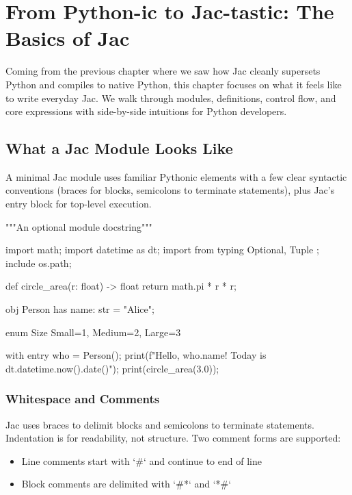 \chapter{From Python-ic to Jac-tastic: The Basics of Jac}

Coming from the previous chapter where we saw how Jac cleanly supersets Python and compiles to native Python, this chapter focuses on what it feels like to write everyday Jac. We walk through modules, definitions, control flow, and core expressions with side-by-side intuitions for Python developers.

\section{What a Jac Module Looks Like}

A minimal Jac module uses familiar Pythonic elements with a few clear syntactic conventions (braces for blocks, semicolons to terminate statements), plus Jac's entry block for top-level execution.

\begin{jacblock}
"""An optional module docstring"""

import math;
import datetime as dt;
import from typing { Optional, Tuple };
include os.path;

def circle_area(r: float) -> float {
    return math.pi * r * r;
}

obj Person {
    has name: str = "Alice";
}

enum Size { Small=1, Medium=2, Large=3 }

with entry {
    who = Person();
    print(f"Hello, {who.name}! Today is {dt.datetime.now().date()}");
    print(circle_area(3.0));
}
\end{jacblock}

\subsection{Whitespace and Comments}

Jac uses braces to delimit blocks and semicolons to terminate statements. Indentation is for readability, not structure. Two comment forms are supported:

\begin{itemize}
    \item Line comments start with `#` and continue to end of line
    \item Block comments are delimited with `#*` and `*#`
\end{itemize}


